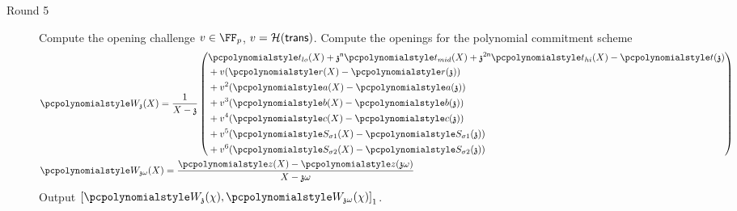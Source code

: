 \let\accentvec\vec \documentclass[runningheads,10pt]{llncs}
\begin{document}
\begin{description}
	\item[Round 5]
	Compute the opening challenge $v \in \FF_p$, $v = \mathcal{H}(\mathsf{trans})$.
	Compute the openings for the polynomial commitment scheme 
	\begin{align*}
	& \p{W_\chz}(X) = \frac{1}{X - \chz} \left(
	\begin{aligned}
		& \p{t_{lo}}(X) + \chz^\numberofconstrains \p{t_{mid}}(X) + \chz^{2 \numberofconstrains} \p{t_{hi}}(X) - \p{t}(\chz)\\
		& + v(\p{r}(X) - \p{r}(\chz)) \\
		& + v^2 (\p{a}(X) - \p{a}(\chz))\\
		& + v^3 (\p{b}(X) - \p{b}(\chz))\\
		& + v^4 (\p{c}(X) - \p{c}(\chz))\\
		& + v^5 (\p{S_{\sigma 1}}(X) - \p{S_{\sigma 1}}(\chz))\\
		& + v^6 (\p{S_{\sigma 2}}(X) - \p{S_{\sigma 2}}(\chz))
	\end{aligned}
	\right)\\
	& \p{W_{\chz \omega}}(X) = \frac{\p{z}(X) - \p{z}(\chz \omega)}{X - \chz \omega}
\end{align*}
	Output $\gone{\p{W_{\chz}}(\chi), \p{W_{\chz \omega}}(\chi)}$.
\end{description}
\end{document}
